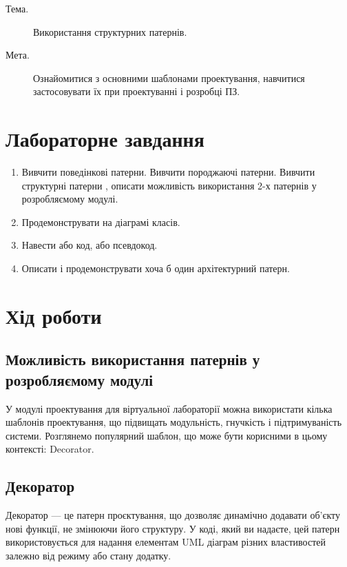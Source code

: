 \documentclass[oneside,14pt]{extarticle}
\newcommand\theme{Використання структурних патернів}
\newcommand\purpose{Ознайомитися з основними шаблонами проектування, навчитися застосовувати їх при проектуванні і розробці ПЗ}
\begin{document}
\begin{normalsize}
	\begin{description}
		\item[Тема.] \theme.
		\item[Мета.] \purpose.
	\end{description}

    \section*{Лабораторне завдання}
    \begin{enumerate}
    	\item Вивчити поведінкові патерни. Вивчити породжаючі патерни. Вивчити структурні патерни , описати можливість використання 2-х патернів у розробляємому модулі.
    	\item Продемонструвати на діаграмі класів.
    	\item Навести або код, або псевдокод.
    	\item Описати і продемонструвати хоча б один архітектурний патерн.
    \end{enumerate}
    
    \section*{Хід роботи}
    \subsection*{Можливість використання патернів у розробляємому модулі}
    У модулі проектування для віртуальної лабораторії можна використати кілька шаблонів проектування, що підвищать модульність, гнучкість і підтримуваність системи. Розглянемо популярний шаблон, що може бути корисними в цьому контексті: Decorator.
    
    \subsection*{Декоратор}
    Декоратор — це патерн проєктування, що дозволяє динамічно додавати об’єкту нові функції, не змінюючи його структуру. У коді, який ви надаєте, цей патерн використовується для надання елементам UML діаграм різних властивостей залежно від режиму або стану додатку.
    

\end{normalsize}
\end{document}
